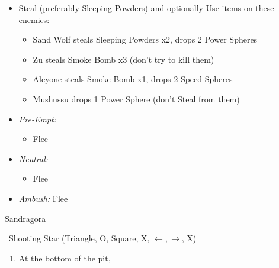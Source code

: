 \begin{encounters}
    \begin{itemize}
        \item Steal (preferably Sleeping Powders) and optionally Use items on these enemies:
        \begin{itemize}
            \item Sand Wolf steals Sleeping Powders x2, drops 2 Power Spheres
            \item Zu steals Smoke Bomb x3 (don't try to kill them)
            \item Alcyone steals Smoke Bomb x1, drops 2 Speed Spheres
            \item Mushussu drops 1 Power Sphere (don't Steal from them)
        \end{itemize}
        \item \textit{Pre-Empt:}
        \begin{itemize}
            \tidusf Defend
            \rikkuf Steal or Use a Smoke Bomb/Silence Grenade/Sleeping Powder
            \luluf Defend
            \item Flee
        \end{itemize}
        \item \textit{Neutral:}
        \begin{itemize}
            \switch{\tidus}{\kimahri}
            \kimahrif Steal
            \rikkuf Switch for \tidus\ or Use a Smoke Bomb/Silence Grenade/Sleeping Powder
            \item Flee
        \end{itemize}
        \item \textit{Ambush:} Flee
    \end{itemize}
\end{encounters}
\begin{battle}{Sandragora}
    \begin{itemize}
        \switch{\tidus}{\auron}
        \auronf \od\ Shooting Star (Triangle, O, Square, X, $\leftarrow, \rightarrow$, X)
    \end{itemize}
\end{battle}
\begin{enumerate}[resume]
    \item At the bottom of the pit, 
\end{enumerate}
\bothnpsingle
